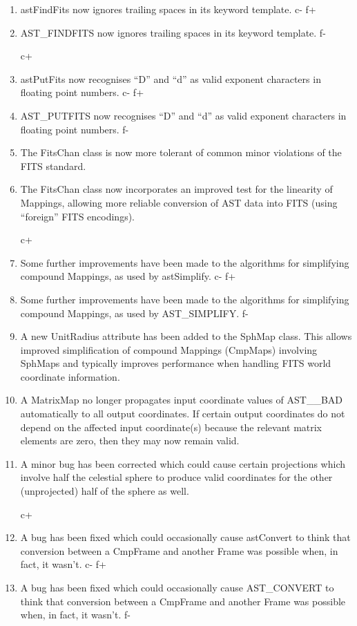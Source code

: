 \documentclass[twoside,11pt]{starlink}
\begin{document}
\begin{enumerate}
c+
\item astFindFits now ignores trailing spaces in its keyword template.
c-
f+
\item AST\_FINDFITS now ignores trailing spaces in its keyword template.
f-

c+
\item astPutFits now recognises ``D'' and ``d'' as valid exponent
characters in floating point numbers.
c-
f+
\item AST\_PUTFITS now recognises ``D'' and ``d'' as valid exponent
characters in floating point numbers.
f-

\item The FitsChan class is now more tolerant of common minor
violations of the FITS standard.

\item The FitsChan class now incorporates an improved test for the
linearity of Mappings, allowing more reliable conversion of AST data
into FITS (using ``foreign'' FITS encodings).

c+
\item Some further improvements have been made to the algorithms for
simplifying compound Mappings, as used by astSimplify.
c-
f+
\item Some further improvements have been made to the algorithms for
simplifying compound Mappings, as used by AST\_SIMPLIFY.
f-

\item A new UnitRadius attribute has been added to the SphMap
class. This allows improved simplification of compound Mappings
(CmpMaps) involving SphMaps and typically improves performance when
handling FITS world coordinate information.

\item A MatrixMap no longer propagates input coordinate values of
AST\_\_BAD automatically to all output coordinates. If certain output
coordinates do not depend on the affected input coordinate(s) because
the relevant matrix elements are zero, then they may now remain valid.

\item A minor bug has been corrected which could cause certain
projections which involve half the celestial sphere to produce valid
coordinates for the other (unprojected) half of the sphere as well.

c+
\item A bug has been fixed which could occasionally cause astConvert
to think that conversion between a CmpFrame and another Frame was
possible when, in fact, it wasn't.
c-
f+
\item A bug has been fixed which could occasionally cause AST\_CONVERT
to think that conversion between a CmpFrame and another Frame was
possible when, in fact, it wasn't.
f-
\end{enumerate}
\end{document}
